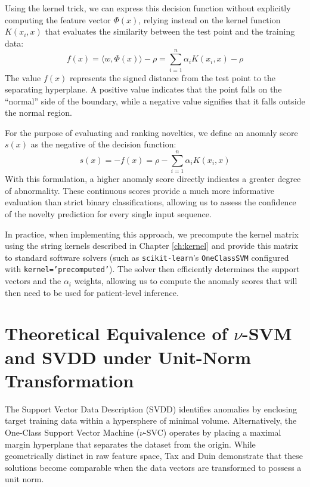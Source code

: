 Using the kernel trick, we can express this decision function without explicitly computing the feature vector $\Phi(x)$, relying instead on the kernel function $K(x_i, x)$ that evaluates the similarity between the test point and the training data:
\begin{equation}\label{eq:decision-function}
f(x) = \langle w, \Phi(x) \rangle - \rho = \sum_{i=1}^n \alpha_i K(x_i, x) - \rho
\end{equation}
The value $f(x)$ represents the signed distance from the test point to the separating hyperplane. A positive value indicates that the point falls on the ``normal'' side of the boundary, while a negative value signifies that it falls outside the normal region.

For the purpose of evaluating and ranking novelties, we define an anomaly score $s(x)$ as the negative of the decision function:
\begin{equation}\label{eq:anomaly-score}
s(x) = -f(x) = \rho - \sum_{i=1}^n \alpha_i K(x_i, x)
\end{equation}
With this formulation, a higher anomaly score directly indicates a greater degree of abnormality. 
These continuous scores provide a much more informative evaluation than strict binary classifications, allowing us to assess the confidence of the novelty prediction for every single input sequence. 

In practice, when implementing this approach, we precompute the kernel matrix using the string kernels described in Chapter \ref{ch:kernel} and provide this matrix to standard software solvers (such as \texttt{scikit-learn}'s \texttt{OneClassSVM} configured with \texttt{kernel='precomputed'}). The solver then efficiently determines the support vectors and the $\alpha_i$ weights, allowing us to compute the anomaly scores that will then need to be used for patient-level inference.

\section{Theoretical Equivalence of $\nu$-SVM and SVDD under Unit-Norm Transformation}\label{sec:svdd-equivalence}
The Support Vector Data Description (SVDD) identifies anomalies by enclosing target training data within a hypersphere of minimal volume. Alternatively, the One-Class Support Vector Machine ($\nu$-SVC) operates by placing a maximal margin hyperplane that separates the dataset from the origin. While geometrically distinct in raw feature space, Tax and Duin demonstrate that these solutions become comparable when the data vectors are transformed to possess a unit norm.


